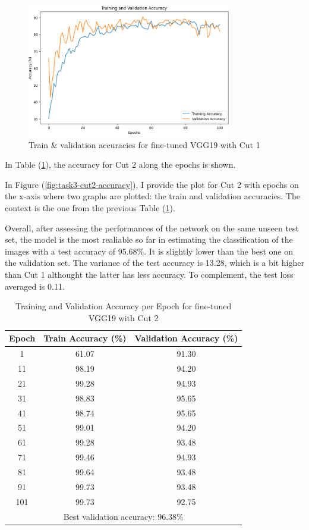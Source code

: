 \documentclass[11pt]{scrartcl}
\begin{document}
\begin{figure}[htbp]
\centering
\includegraphics[width=0.8\textwidth]{./figures/task3-cut1-accuracy.png}
\caption{Train \& validation accuracies for fine-tuned VGG19 with Cut 1}
\label{fig:task3-cut1-accuracy}
\end{figure}


In Table (\ref{tab:task3-cut2-accuracy}),
the accuracy for Cut 2 along the epochs is shown.

In Figure (\ref{fig:task3-cut2-accuracy}), 
I provide the plot for Cut 2 with epochs on the x-axis where two graphs are plotted:
the train and validation accuracies.
The context is the one from the previous Table (\ref{tab:task3-cut2-accuracy}). 

Overall, after assessing the performances of the network on the same unseen test set,
the model is the most realiable so far in estimating the classification of the images with
a test accuracy of 95.68\%.
It is slightly lower than the best one on the validation set.
The variance of the test accuracy is 13.28,
which is a bit higher than Cut 1 althought the latter has less accuracy.
To complement, the test loss averaged is 0.11.


\begin{table}[htbp]
\centering
\caption{Training and Validation Accuracy per Epoch for fine-tuned VGG19 with Cut 2}
\begin{tabular}{ccc}
\toprule
\textbf{Epoch} & \textbf{Train Accuracy (\%)} & \textbf{Validation Accuracy (\%)} \\
\midrule
1    & 61.07  & 91.30 \\
11   & 98.19  & 94.20 \\
21   & 99.28  & 94.93 \\
31   & 98.83  & 95.65 \\
41   & 98.74  & 95.65 \\
51   & 99.01  & 94.20 \\
61   & 99.28  & 93.48 \\
71   & 99.46  & 94.93 \\
81   & 99.64  & 93.48 \\
91   & 99.73  & 93.48 \\
101  & 99.73  & 92.75 \\
\midrule
\multicolumn{3}{c}{Best validation accuracy: 96.38\%} \\
\bottomrule
\end{tabular}
\label{tab:task3-cut2-accuracy}
\end{table}
\end{document}
